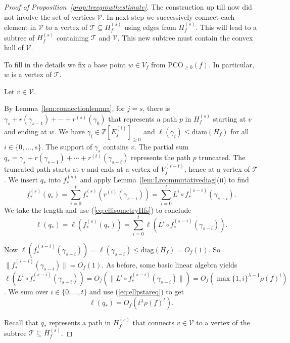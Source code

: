 \documentclass[12pt,oneside,a4]{amsart}
\newcommand{\IZ}{\mathbb{Z}}
\newcommand{\cV}{\mathcal{V}}
\newcommand{\cT}{\mathcal{T}}
\numberwithin{maincounter}{section}
\numberwithin{equation}{section}
\renewcommand{\subset}{\subseteq}
\newcommand{\pco}{\mathrm{PCO}}
\begin{document}
\begin{proof}[Proof of Proposition~\ref{prop:treegrowthestimate}]
  The construction up till now did not involve the set of vertices
  $\cV$. In next step we successively connect each element in $\cV$ to
  a vertex of $\cT\subset H_f^{(s)}$ using edges from $H_f^{(s)}$.
  This will lead to a
  subtree of $H_f^{(s)}$ containing $\cT$ and $\cV$. This new subtree
  must contain the  convex hull of $\cV$.   

  To fill in the details
  we fix a base point $w\in V_f$ from $\pco_{\ge 0}(f)$. In
  particular, $w$ is a vertex of $\cT$.

  Let $v\in \cV$.
  
  By Lemma~\ref{lem:connectionlemma}, for $j=s$, there is $\gamma_s +
  r(\gamma_{s-1})+\cdots + r^{(s)}(\gamma_0)$ that represents a path $p$
  in $H_f^{(s)}$ starting at  $v$ and ending at $w$. We have 
  $\gamma_i \in \IZ[E_f^{(i)}]_{\ge 0}$ and $\ell(\gamma_i)\le
  \mathrm{diam}(H_f)$ for all $i\in \{0,\ldots,s\}$.
  The support of $\gamma_s$ contains $v$. 
  The partial sum $q_* = \gamma_s + r(\gamma_{s-1})+\cdots +
  r^{(t)}(\gamma_{s-t})$ represents
  the path $p$ truncated.
  The truncated path starts at $v$ and ends at a vertex of
   $V_f^{(s-t)}$, hence at a vertex of $\cT$.
  We insert $q_*$ into  $f_*^{(s)}$ and
  apply
  Lemma~\ref{lem:Lrcommutativediag}(ii) to find
  \begin{equation*}
    f_*^{(s)}(q_*) = \sum_{i=0}^t f_*^{(s)}(r^{(i)}(\gamma_{s-i}))=  \sum_{i=0}^{t} L^{i} \circ f_*^{(s-i)}(\gamma_{s-i}).    
  \end{equation*}
  We take  the length and use (\ref{eq:ellisometryHfs}) to conclude
  \begin{equation}
    \label{eq:ellpstareq}
    \ell(q_*) = \ell(f_*^{(s)}(q_*)) =  \sum_{i=0}^{t}
      \ell\left(L^i \circ f_*^{(s-i)}(\gamma_{s-i})\right).
  \end{equation}

  Now $\ell(f_*^{(s-i)}(\gamma_{s-i})) = \ell (\gamma_{s-i}) \le
  \mathrm{diag}(H_f) = O_f(1)$.
  So $\|f_*^{(s-i)}(\gamma_{s-i})\| = O_f(1)$. 
  As before, some basic linear algebra yields
  $\ell\left(L^i \circ f_*^{(s-i)}(\gamma_{s-i})\right) =
  O_f(\| L^i \circ f_*^{(s-i)}(\gamma_{s-i})\|)=
  O_f(\max\{1,i\}^{\lambda-1}\rho(f)^i)$.
  We  sum over $i\in \{0,\ldots,t\}$ and use (\ref{eq:ellpstareq})
  to get
  \begin{equation}
    \label{eq:connecttoT}
    \ell(q_*) = O_f(t^{\lambda} \rho(f)^{t}). 
  \end{equation}
  
  Recall that $q_*$  represents a path in
  $H_f^{(s)}$ that connects $v\in\cV$  to a vertex of the
  subtree $\cT\subset H_f^{(s)}$.


\end{proof}
\end{document}
